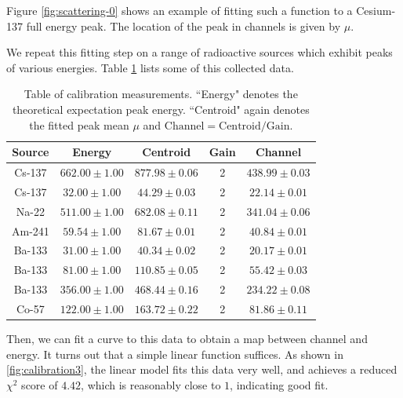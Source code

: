 \documentclass[12pt, letterpaper]{article}
\begin{document}
Figure \ref{fig:scattering-0} shows an example of fitting such a function to a Cesium-137 full energy peak. The location of the peak in channels is given by $\mu$. 

We repeat this fitting step on a range of radioactive sources which exhibit peaks of various energies. Table \ref{table:calibration3} lists some of this collected data. 

\begin{table}[!h]
\footnotesize
\centering
\begin{tabular}{| c c | c c | c |}
    \hline
    Source & Energy & Centroid & Gain & \textbf{Channel} \\
    \hline
    Cs-137 & $662.00 \pm 1.00$ & $877.98 \pm 0.06$ & 2 & $438.99 \pm 0.03$\\
    Cs-137 & $32.00 \pm 1.00$ & $44.29 \pm 0.03$ & 2 & $22.14 \pm 0.01$\\
    Na-22 & $511.00 \pm 1.00$ & $682.08 \pm 0.11$ & 2 & $341.04 \pm 0.06$ \\
    Am-241 & $59.54 \pm 1.00$ & $81.67 \pm 0.01$ & 2 & $40.84 \pm 0.01$ \\
    Ba-133 & $31.00 \pm 1.00$ & $40.34 \pm 0.02$ & 2 & $20.17 \pm 0.01$ \\
    Ba-133 & $81.00 \pm 1.00$ & $110.85 \pm 0.05$ & 2 & $55.42 \pm 0.03$ \\
    Ba-133 & $356.00 \pm 1.00$ & $468.44 \pm 0.16$ & 2 & $234.22 \pm 0.08$ \\
    Co-57 & $122.00 \pm 1.00$ & $163.72 \pm 0.22$ & 2 & $81.86 \pm 0.11$ \\
    \hline
\end{tabular}
\caption{
    Table of calibration measurements. ``Energy" denotes the theoretical expectation peak energy. ``Centroid" again denotes the fitted peak mean $\mu$ and $\text{Channel}=\text{Centroid}/\text{Gain}$. 
}
\label{table:calibration3}
\end{table}

Then, we can fit a curve to this data to obtain a map between channel and energy. It turns out that a simple linear function suffices. As shown in \ref{fig:calibration3}, the linear model fits this data very well, and achieves a reduced $\chi^2$ score of $4.42$, which is reasonably close to $1$, indicating good fit. 
\end{document}
